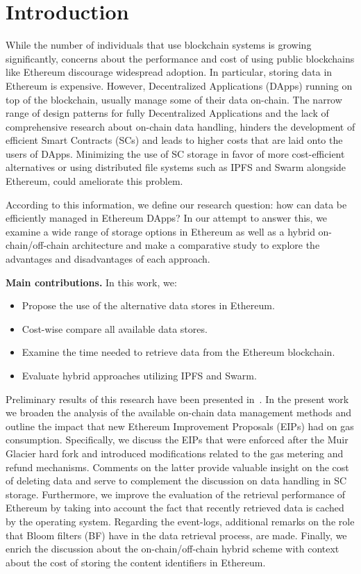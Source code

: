 \chapter{Introduction}\label{chapter:introduction}
While the number of individuals that use blockchain systems is growing significantly, concerns about the performance and cost of using public blockchains like Ethereum \citep{buterin_2014} discourage widespread adoption. In particular, storing data in Ethereum is expensive. However, Decentralized Applications (DApps) running on top of the blockchain, usually manage some of their data on-chain. The narrow range of design patterns for fully Decentralized Applications \citep{wohrer_2021} and the lack of comprehensive research about on-chain data handling, hinders the development of efficient Smart Contracts (SCs) and leads to higher costs that are laid onto the users of DApps. Minimizing the use of SC storage in favor of more cost-efficient alternatives or using distributed file systems such as IPFS \citep{benet_2014} and Swarm \citep{tron_2020} alongside Ethereum, could ameliorate this problem.

According to this information, we define our research question: how can data be efficiently managed in Ethereum DApps?
In our attempt to answer this, we examine a wide range of storage options in Ethereum as well as a hybrid on-chain/off-chain architecture and make a comparative study to explore the advantages and disadvantages of each approach. 

{\bf Main contributions.} In this work, we:
\begin{itemize}[topsep=0pt, itemsep=0pt]
\item{Propose the use of the alternative data stores in Ethereum.}
\item{Cost-wise compare all available data stores.}
\item{Examine the time needed to retrieve data from the Ethereum blockchain.}
\item{Evaluate hybrid approaches utilizing IPFS and Swarm.}
\end{itemize}

Preliminary results of this research have been presented in~\citep{kostamis_2021}.
In the present work we broaden the analysis of the available on-chain data management methods and outline the impact that new Ethereum Improvement Proposals (EIPs) had on gas consumption. Specifically, we discuss the EIPs that were enforced after the Muir Glacier hard fork and introduced modifications related to the gas metering and refund mechanisms. Comments on the latter provide valuable insight on the cost of deleting data and serve to complement the discussion on data handling in SC storage.
Furthermore, we improve the evaluation of the retrieval performance 
of Ethereum by taking into account the fact that
recently retrieved data is cached by the operating system. Regarding the event-logs, additional remarks on the role that Bloom filters (BF) have in the data retrieval process, are made.
Finally, we enrich the discussion about the on-chain/off-chain
hybrid scheme with context about the cost of storing
the content identifiers in Ethereum.



